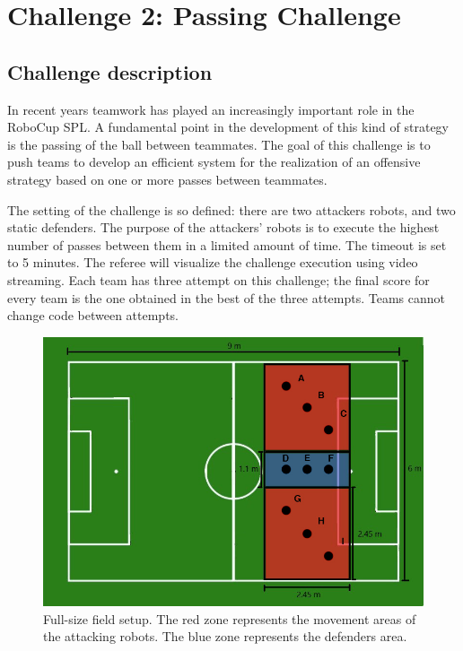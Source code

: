 \section{Challenge 2: Passing Challenge}
\label{sec:PassingChallenge}

\subsection{Challenge description}
In recent years teamwork has played an increasingly important role in the RoboCup SPL. A fundamental point in the development of this kind of strategy is the passing of the ball between teammates. The goal of this challenge is to push teams to develop an efficient system for the realization of an offensive strategy based on one or more passes between teammates. 

The setting of the challenge is so defined: there are two attackers robots, and two static defenders. The purpose of the attackers' robots is to execute the highest number of passes between them in a limited amount of time. The timeout is set to 5 minutes.
The referee will visualize the challenge execution using video streaming. 
Each team has three attempt on this challenge; the final score for every team is the one obtained in the best of the three attempts. Teams cannot change code between attempts.
\begin{figure}[ht]
\includegraphics[width=0.95\linewidth]{figs/ch_2_full.jpg}
\caption{Full-size field setup. The red zone represents the movement areas of the attacking robots. The blue zone represents the defenders area. }
\label{ch2:zone96}
\centering
\end{figure}

